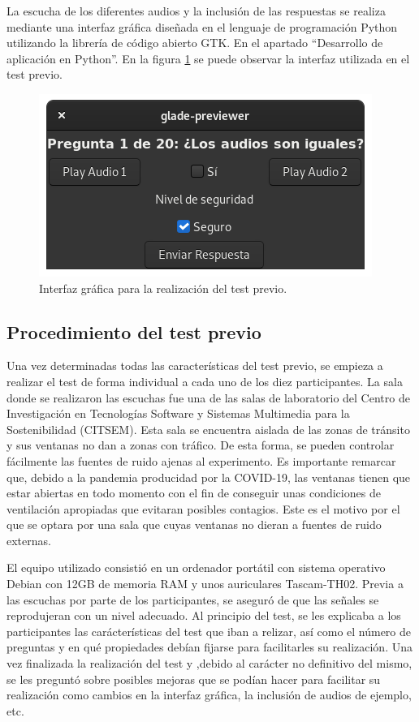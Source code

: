 \documentclass[11pt,a4paper,twoside]{book}
\begin{document}
                La escucha de los diferentes audios y la inclusión de las respuestas se realiza mediante una interfaz gráfica diseñada en el lenguaje de programación Python utilizando la librería de código abierto GTK. En el apartado ``Desarrollo de aplicación en Python''. En la figura \ref{fig:interfazInicial} se puede observar la interfaz utilizada en el test previo.
                
                \begin{figure}
                    \includegraphics[scale=0.6]{../imagenes/uiIni.png}
			        \centering
			        \caption{Interfaz gráfica para la realización del test previo.}
			        \label{fig:interfazInicial}
                \end{figure}
            \subsection{Procedimiento del test previo}
                Una vez determinadas todas las características del test previo, se empieza a realizar el test de forma individual a cada uno de los diez participantes. La sala donde se realizaron las escuchas fue una de las salas de laboratorio del Centro de Investigación en Tecnologías Software y Sistemas Multimedia para la Sostenibilidad (CITSEM). Esta sala se encuentra aislada de las zonas de tránsito y sus ventanas no dan a zonas con tráfico. De esta forma, se pueden controlar fácilmente las fuentes de ruido ajenas al experimento. Es importante remarcar que, debido a la pandemia producidad por la COVID-19, las ventanas tienen que estar abiertas en todo momento con el fin de conseguir unas condiciones de ventilación apropiadas que evitaran posibles contagios. Este es el motivo por el que se optara por una sala que cuyas ventanas no dieran a fuentes de ruido externas.
                
                El equipo utilizado consistió en un ordenador portátil con sistema operativo Debian con 12GB de memoria RAM y unos auriculares Tascam-TH02. Previa a las escuchas por parte de los participantes, se aseguró de que las señales se reprodujeran con un nivel adecuado. Al principio del test, se les explicaba a los participantes las carácterísticas del test que iban a relizar, así como el número de preguntas y en qué propiedades debían fijarse para facilitarles su realización. Una vez finalizada la realización del test y ,debido al carácter no definitivo del mismo, se les preguntó sobre posibles mejoras que se podían hacer para facilitar su realización como cambios en la interfaz gráfica, la inclusión de audios de ejemplo, etc. 
            
\end{document}
